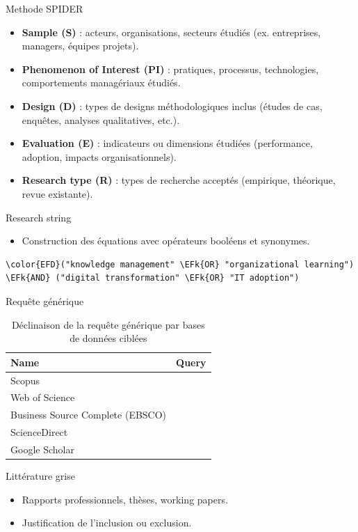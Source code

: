 \documentclass[a4paper,12pt]{article}
\newcommand{\EFk}[1]{\textcolor{EFk}{#1}} %
\begin{document}
Methode SPIDER
\begin{itemize}
\item \textbf{\textbf{Sample (S)}} : acteurs, organisations, secteurs étudiés (ex. entreprises, managers, équipes projets).
\item \textbf{\textbf{Phenomenon of Interest (PI)}} : pratiques, processus, technologies, comportements managériaux étudiés.
\item \textbf{\textbf{Design (D)}} : types de designs méthodologiques inclus (études de cas, enquêtes, analyses qualitatives, etc.).
\item \textbf{\textbf{Evaluation (E)}} : indicateurs ou dimensions étudiées (performance, adoption, impacts organisationnels).
\item \textbf{\textbf{Research type (R)}} : types de recherche acceptés (empirique, théorique, revue existante).
\end{itemize}

Research string
\begin{itemize}
\item Construction des équations avec opérateurs booléens et synonymes.
\end{itemize}

\begin{listing}[htbp]
\begin{Code}
\begin{Verbatim}
\color{EFD}("knowledge management" \EFk{OR} "organizational learning") \EFk{AND} ("digital transformation" \EFk{OR} "IT adoption")
\end{Verbatim}
\end{Code}
\caption{\label{lst:org1d894c5}Requête générique}
\end{listing}

\begin{table}[htbp]
\caption{\label{tab:orga79d12b}Déclinaison de la requête générique par bases de données ciblées}
\centering
\begin{tabular}{ll}
Name & Query\\
\hline
Scopus & \\
Web of Science & \\
Business Source Complete (EBSCO) & \\
ScienceDirect & \\
Google Scholar & \\
\end{tabular}
\end{table}

Littérature grise
\begin{itemize}
\item Rapports professionnels, thèses, working papers.
\item Justification de l’inclusion ou exclusion.
\end{itemize}
\end{document}
